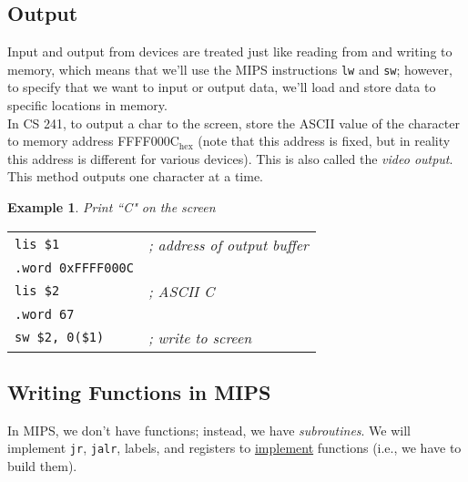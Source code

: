\documentclass{report}
\newtheorem{ex}{Example}[section]
\begin{document}
\subsection{Output}
Input and output from devices are treated just like reading from and writing to memory, which means that we'll use the MIPS instructions \texttt{lw} and \texttt{sw}; however, to specify that we want to input or output data, we'll load and store data to specific locations in memory.\\
In CS 241, to output a char to the screen, store the ASCII value of the character to memory address FFFF000C$_{\mathrm{hex}}$ (note that this address is fixed, but in reality this address is different for various devices). This is also called the \textit{video output}. This method outputs one character at a time. \newpage
\begin{ex}
Print ``C" on the screen
\end{ex}
\begin{tabular}{ l l }
\texttt{lis \$1} & \textit{; address of output buffer} \\
\texttt{.word 0xFFFF000C} & \\
\texttt{lis \$2} & \textit{; ASCII C} \\
\texttt{.word 67} & \\
\texttt{sw \$2, 0(\$1)} & \textit{; write to screen}
\end{tabular}

\subsection{Writing Functions in MIPS}
In MIPS, we don't have functions; instead, we have \textit{subroutines}. We will implement \texttt{jr}, \texttt{jalr}, labels, and registers to \underline{implement} functions (i.e., we have to build them).
\end{document}
